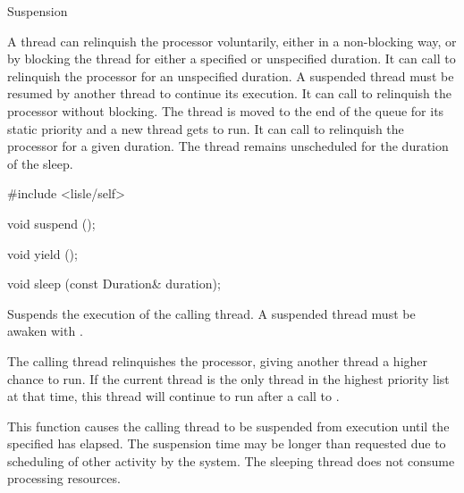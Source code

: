 

\begin{manpage}{Suspension}
\let\savedmanlayout=\manlayout
\renewcommand{\manlayout}{vcompact}

A thread can relinquish the processor voluntarily, either in a non-blocking way, or by blocking the thread for either a specified or unspecified duration.
It can call  to relinquish the processor for an unspecified duration.
A suspended thread must be resumed by another thread to continue its execution.
It can call  to relinquish the processor without blocking.
The thread is moved to the end of the queue for its static priority and a new thread gets to run.
It can call  to relinquish the processor for a given duration.
The thread remains unscheduled for the duration of the sleep.

\begin{mansynopsis}
#include <lisle/self>

void suspend ();

void yield ();

void sleep (const Duration& duration);
\end{mansynopsis}

\begin{mandescription}
  Suspends the execution of the calling thread.
  A suspended thread must be awaken with .

    The calling thread relinquishes the processor, giving another thread a higher chance to run.
    If the current thread is the only thread in the highest priority list at that time, this thread will continue to run after a call to .

    This function causes the calling thread to be suspended from execution until the specified  has elapsed.
    The suspension time may be longer than requested due to scheduling of other activity by the system.
    The sleeping thread does not consume processing resources.
\end{mandescription}

\renewcommand{\manlayout}{\savedmanlayout}
\end{manpage}


